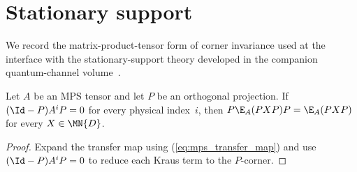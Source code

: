 \section{Stationary support}

We record the matrix-product-tensor form of corner invariance used at the
interface with the stationary-support theory developed in the companion
quantum-channel volume~\cite[Chapter ``Channel asymptotics]{QICLean2026Blueprint}.

\begin{lemma}%
    \label{lem:lower_zero_invariance}
    \leanok
    Let $A$ be an MPS tensor and let $P$ be an orthogonal projection.
    If $(\Id-P)A^iP=0$ for every physical index~$i$, then
    $P\E_A(PXP)P=\E_A(PXP)$ for every $X\in\MN{D}$.
\end{lemma}

\begin{proof}\leanok
    Expand the transfer map using (\ref{eq:mps_transfer_map}) and use
    $(\Id-P)A^iP=0$ to reduce each Kraus term to the $P$-corner.
\end{proof}
